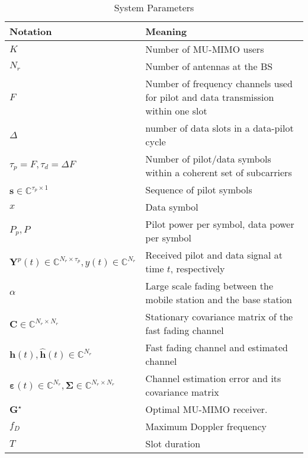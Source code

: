 \documentclass[conference, a4paper, 10pt]{IEEEtran}
\newcommand{\mx}[1]{\mathbf{#1}}
\newcommand{\bs}[1]{\boldsymbol{#1}}
\begin{document}
\begin{table}[t]
\caption{System Parameters}
\vspace{2mm}
\label{tab:notation}
\footnotesize
\begin{tabularx}{\columnwidth}{|X|X|}
\hline
\hline
\textbf{Notation} & \textbf{Meaning} \\
\hline
\hline
$K$ & Number of \ac{MU-MIMO} users \\
\hline
$N_r$ & Number of antennas at the BS \\
\hline
$F$ & Number of frequency channels used for pilot and data transmission within one slot \\
\hline
$\Delta$ & number of data slots in a data-pilot cycle \\
\hline
$\tau_p=F, \tau_d=\Delta F$ & Number of pilot/data symbols within a coherent set of subcarriers  \\
\hline
$\mx{s}\in \mathds{C}^{\tau_p \times 1}$ & Sequence of pilot symbols\\
\hline
$x$ & Data symbol \\
\hline
$P_p, P$ & Pilot power per symbol, data power per symbol\\
\hline
$\mx{Y}^p(t) \in \mathds{C}^{N_r \times \tau_p}, y(t) \in \mathds{C}^{N_r}$ & Received pilot and data signal at time $t$, respectively  \\
\hline
$\alpha$ & Large scale fading between the mobile station and the base station \\
\hline
$\mx{C} \in \mathds{C}^{N_r \times N_r}$ & Stationary covariance matrix of the fast fading channel \\
\hline
$\mx{h}(t), \hat{\mx{h}}(t) \in \mathds{C}^{N_r}$ & Fast fading channel and estimated channel \\
\hline
$\bs{\varepsilon}(t) \in \mathds{C}^{N_r}, \bs{\Sigma} \in \mathds{C}^{N_r \times N_r}$
& Channel estimation error and its covariance matrix\\
\hline
$\mx{G}^\star$ & Optimal MU-MIMO receiver. \\
\hline
$f_D$ & Maximum Doppler frequency \\
\hline
$T$ & Slot duration \\
\hline
\end{tabularx}
\end{table}
\end{document}
